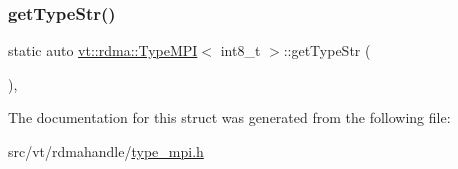 \mbox{\label{structvt_1_1rdma_1_1_type_m_p_i_3_01int8__t_01_4_af47196464894d2fa59fad5ad0378652c}} 
\subsubsection{\texorpdfstring{get\+Type\+Str()}{getTypeStr()}}
{\footnotesize\ttfamily static auto \hyperlink{structvt_1_1rdma_1_1_type_m_p_i}{vt\+::rdma\+::\+Type\+M\+PI}$<$ int8\+\_\+t $>$\+::get\+Type\+Str (\begin{DoxyParamCaption}{ }\end{DoxyParamCaption})\hspace{0.3cm}{\ttfamily [inline]}, {\ttfamily [static]}}



The documentation for this struct was generated from the following file\+:\begin{DoxyCompactItemize}
\item 
src/vt/rdmahandle/\hyperlink{type__mpi_8h}{type\+\_\+mpi.\+h}\end{DoxyCompactItemize}
